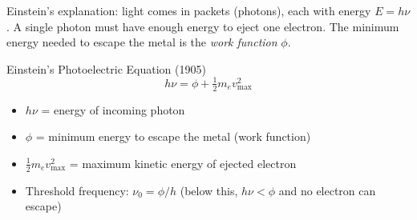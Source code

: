 \documentclass[12pt, a4paper]{book}
\newcommand{\newterm}[1]{\textit{\textcolor{DiscoveryColor}{#1}}}
\begin{document}
\vspace{0.5em}

Einstein's explanation: light comes in packets (photons),
each with energy $E = h\nu$.
A single photon must have enough energy to eject one electron.
The minimum energy needed to escape the metal is
the \newterm{work function} $\phi$.

\begin{namedconcept}{Einstein's Photoelectric Equation (1905)}
\[
  h\nu = \phi + \tfrac{1}{2}m_e v_\text{max}^2
\]
\vspace{-6pt}
\begin{itemize}[nosep, leftmargin=2em]
  \item $h\nu$ = energy of incoming photon
  \item $\phi$ = minimum energy to escape the metal (work function)
  \item $\tfrac{1}{2}m_e v_\text{max}^2$ = maximum kinetic energy
        of ejected electron
  \item Threshold frequency: $\nu_0 = \phi/h$
        (below this, $h\nu < \phi$ and no electron can escape)
\end{itemize}
\end{namedconcept}
\end{document}
